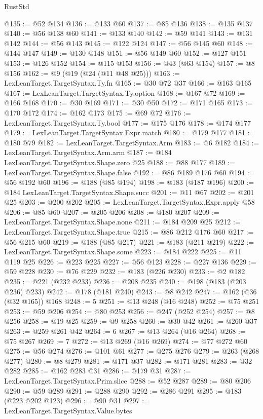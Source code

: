 \begin{lexlean}{RustStd}
\begin{coremodule}
@135 := @52 @134
@136 := @133 @60
@137 := @85 @136
@138 := @135 @137
@140 := @56 @138 @60
@141 := @133 @140
@142 := @59 @141
@143 := @131 @142
@144 := @56 @143
@145 := @122 @124
@147 := @56 @145 @60
@148 := @144 @147
@149 := @130 @148
@151 := @56 @149 @60
@152 := @127 @151
@153 := @126 @152
@154 := @115 @153
@156 := @43 (@63 @154)
@157 := @8 @156
@162 := @9 (@19 (@24 (@11 @48 @25)))
@163 := LexLeanTarget.TargetSyntax.Ty.fn
@165 := @30 @72 @37
@166 := @163 @165
@167 := LexLeanTarget.TargetSyntax.Ty.option
@168 := @167 @72
@169 := @166 @168
@170 := @30 @169
@171 := @30 @50
@172 := @171 @165
@173 := @170 @172
@174 := @162 @173
@175 := @69 @72
@176 := LexLeanTarget.TargetSyntax.Ty.bool
@177 := @175 @176
@178 := @174 @177
@179 := LexLeanTarget.TargetSyntax.Expr.match
@180 := @179 @177
@181 := @180 @79
@182 := LexLeanTarget.TargetSyntax.Arm
@183 := @6 @182
@184 := LexLeanTarget.TargetSyntax.Arm.arm
@187 := @184 LexLeanTarget.TargetSyntax.Shape.zero @25
@188 := @88 @177
@189 := LexLeanTarget.TargetSyntax.Shape.false
@192 := @86 @189 @176 @60
@194 := @56 @192 @60
@196 := @188 (@85 @194)
@198 := @183 (@187 @196)
@200 := @184 LexLeanTarget.TargetSyntax.Shape.succ
@201 := @11 @67
@202 := @201 @25
@203 := @200 @202
@205 := LexLeanTarget.TargetSyntax.Expr.apply @58
@206 := @85 @60
@207 := @205 @206
@208 := @180 @207
@209 := LexLeanTarget.TargetSyntax.Shape.none
@211 := @184 @209 @25
@212 := LexLeanTarget.TargetSyntax.Shape.true
@215 := @86 @212 @176 @60
@217 := @56 @215 @60
@219 := @188 (@85 @217)
@221 := @183 (@211 @219)
@222 := LexLeanTarget.TargetSyntax.Shape.some
@223 := @184 @222
@225 := @11 @119 @25
@226 := @223 @225
@227 := @56 @123
@228 := @227 @136
@229 := @59 @228
@230 := @76 @229
@232 := @183 (@226 @230)
@233 := @2 @182
@235 := @221 (@232 @233)
@236 := @208 @235
@240 := @198 (@183 (@203 @236) @233)
@242 := @178 (@181 @240)
@243 := @8 @242
@247 := @162 (@36 (@32 @165)) @168
@248 := 5
@251 := @13 @248 (@16 @248)
@252 := @75 @251
@253 := @59 @206
@254 := @80 @253
@256 := @247 (@252 @254)
@257 := @8 @256
@258 := @19 @25
@259 := @9 @258
@260 := @30 @42
@261 := @260 @37
@263 := @259 @261 @42
@264 := 6
@267 := @13 @264 (@16 @264)
@268 := @75 @267
@269 := 7
@272 := @13 @269 (@16 @269)
@274 := @77 @272 @60
@275 := @56 @274
@276 := @101 @61
@277 := @275 @276
@279 := @263 (@268 @277)
@280 := @8 @279
@281 := @171 @37
@282 := @171 @281
@283 := @32 @282
@285 := @162 @283 @31
@286 := @179 @31
@287 := LexLeanTarget.TargetSyntax.Prim.slice
@288 := @52 @287
@289 := @80 @206
@290 := @59 @289
@291 := @288 @290
@292 := @286 @291
@295 := @183 (@223 @202 @123)
@296 := @90 @31
@297 := LexLeanTarget.TargetSyntax.Value.bytes

\end{coremodule}
\end{lexlean}
